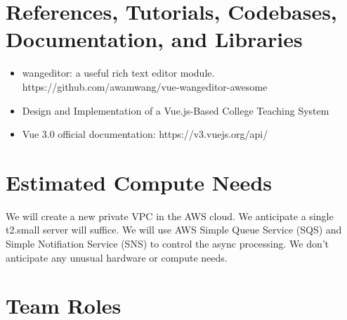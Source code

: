 
% 

\section{References, Tutorials, Codebases, Documentation, and Libraries}  
\begin{itemize}
    \item \noindent [1] wangeditor: a useful rich text editor module. https://github.com/awamwang/vue-wangeditor-awesome
    \item \noindent [2] Design and Implementation of a Vue.js-Based College Teaching System
    \item \noindent [3] Vue 3.0 official documentation: https://v3.vuejs.org/api/
\end{itemize}


\section{Estimated Compute Needs}  

We will create a new private VPC in the AWS cloud.
We anticipate a single t2.small server will suffice.
We will use AWS Simple Queue Service (SQS) and Simple Notifiation Service (SNS) to control the async processing.
We don't anticipate any unusual hardware or compute needs.

\section{Team Roles} 

